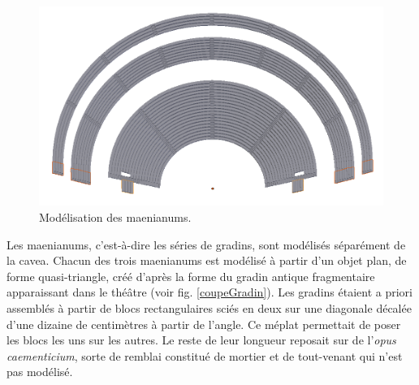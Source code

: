 \begin{figure}[!h]
\centering
	\includegraphics[width=\linewidth]{images/modMaenianum}
	\caption{Modélisation des \glspl{maenianum}.} 
	\label{modMaenianum} 
\end{figure} 

Les \glspl{maenianum}, c'est-à-dire les séries de gradins, sont modélisés séparément de la \gls{cavea}. Chacun des trois \glspl{maenianum} est modélisé à partir d'un objet plan, de forme quasi-triangle, créé d'après la forme du gradin antique fragmentaire apparaissant dans le théâtre (voir fig. \ref{coupeGradin}). Les gradins étaient a priori assemblés à partir de blocs rectangulaires sciés en deux sur une diagonale décalée d'une dizaine de centimètres à partir de l'angle. Ce méplat permettait de poser les blocs les uns sur les autres. Le reste de leur longueur reposait sur de l'\textit{opus caementicium}, sorte de remblai constitué de mortier et de tout-venant qui n'est pas modélisé. 

